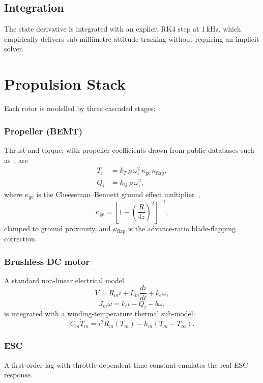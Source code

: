 \documentclass[a4paper, conference]{IEEEtran}
\begin{document}
\subsection{Integration}
The state derivative is integrated with an explicit RK4 step at
1\,kHz, which empirically delivers sub-millimetre attitude tracking
without requiring an implicit solver.

\section{Propulsion Stack}\label{sec:prop}
Each rotor is modelled by three cascaded stages:

\subsubsection{Propeller (BEMT)}
Thrust and torque, with propeller coefficients drawn from public databases
such as~\cite{uiuc}, are
\begin{align}
T_i &= k_T \, \rho \, \omega_i^2 \, \kappa_{\mathrm{ge}} \, \kappa_{\mathrm{flap}}, \\
Q_i &= k_Q \, \rho \, \omega_i^2,
\end{align}
where $\kappa_{\mathrm{ge}}$ is the Cheeseman--Bennett ground effect
multiplier~\cite{cheeseman},
\begin{equation}
\kappa_{\mathrm{ge}} = \left[1-\left(\frac{R}{4z}\right)^2\right]^{-1},
\end{equation}
clamped to ground proximity, and $\kappa_{\mathrm{flap}}$ is the
advance-ratio blade-flapping correction.

\subsubsection{Brushless DC motor}
A standard non-linear electrical model
\begin{equation}
V = R_m i + L_m \frac{di}{dt} + k_e \omega,
\end{equation}
\begin{equation}
J_m \dot{\omega} = k_t i - Q_i - b\omega,
\end{equation}
is integrated with a winding-temperature thermal sub-model:
\begin{equation}
C_m \dot{T}_m = i^2 R_m(T_m) - h_m(T_m - T_\infty).
\end{equation}

\subsubsection{ESC}
A first-order lag with throttle-dependent time constant emulates the
real ESC response.
\end{document}
